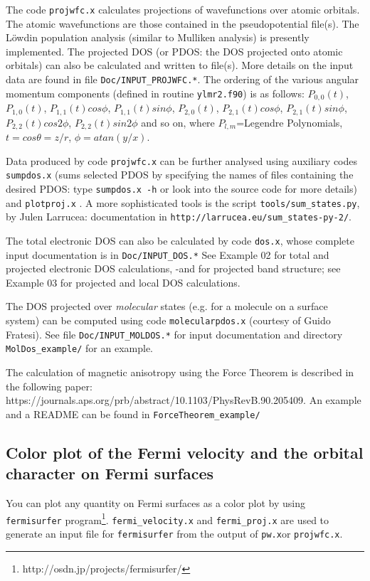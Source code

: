 \documentclass[12pt,a4paper]{article}
\def\pwx{\texttt{pw.x}}
\begin{document}
The code \texttt{projwfc.x} calculates projections of wavefunctions
over atomic orbitals. The atomic wavefunctions are those contained
in the pseudopotential file(s). The L\"owdin population analysis (similar to
Mulliken analysis) is presently implemented. The projected DOS (or PDOS:
the DOS projected onto atomic orbitals) can also be calculated and written
to file(s). More details on the input data are found in file
\texttt{Doc/INPUT\_PROJWFC.*}. The ordering of the various 
angular momentum components (defined in routine \texttt{ylmr2.f90})
is as follows:
$P_{0,0}(t)$, $P_{1,0}(t)$, $P_{1,1}(t)cos\phi$, $P_{1,1}(t)sin\phi$,
 $P_{2,0}(t)$, $P_{2,1}(t)cos\phi$, $P_{2,1}(t)sin\phi$, 
 $P_{2,2}(t)cos2\phi$, $P_{2,2}(t)sin2\phi$
and so on, where $P_{l,m}$=Legendre Polynomials, 
$t = cos\theta = z/r$, $\phi= atan(y /x)$.

Data produced by code \texttt{projwfc.x} can be further 
analysed using auxiliary codes \texttt{sumpdos.x} (sums selected PDOS
by specifying the names of files containing the desired PDOS: type 
\texttt{sumpdos.x -h} or look into the source code for more details) 
and \texttt{plotproj.x} . A more sophisticated tools is the script
\texttt{tools/sum\_states.py}, by Julen Larrucea: documentation in
\texttt{http://larrucea.eu/sum\_states-py-2/}.

The total electronic DOS can also be calculated by code \texttt{dos.x},
whose complete input documentation is in \texttt{Doc/INPUT\_DOS.*}
See Example 02 for total and projected electronic DOS calculations,
-and for projected band structure;
see Example 03 for projected and local DOS calculations.

The DOS projected over {\em molecular} states (e.g. for a molecule on
a surface system) can be computed using code \texttt{molecularpdos.x}
(courtesy of Guido Fratesi). See file \texttt{Doc/INPUT\_MOLDOS.*}
for input documentation and directory \texttt{MolDos\_example/} for
an example.

The calculation of magnetic anisotropy using the Force Theorem is described
in the following paper:
https://journals.aps.org/prb/abstract/10.1103/PhysRevB.90.205409. An
example and a README can be found in \texttt{ForceTheorem\_example/}

\subsection{Color plot of the Fermi velocity and the orbital character
  on Fermi surfaces}

You can plot any quantity on Fermi surfaces as a color plot 
by using \verb|fermisurfer| program\footnote{http://osdn.jp/projects/fermisurfer/}.
\verb|fermi_velocity.x| and \verb|fermi_proj.x| are used 
to generate an input file for \verb|fermisurfer| from the output
of \pwx or \verb|projwfc.x|.
\end{document}
